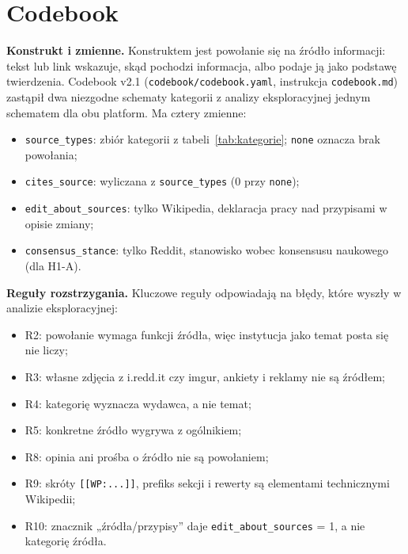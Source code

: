 \documentclass[11pt,a4paper]{article}
\newcommand{\kod}[1]{\texttt{#1}}
\newcommand{\tabela}[1]{{\small}}
\begin{document}
\section{Codebook}
\label{sec:codebook}

\textbf{Konstrukt i zmienne.} Konstruktem jest powołanie się na źródło informacji: tekst lub link wskazuje, skąd pochodzi informacja, albo podaje ją jako podstawę twierdzenia. Codebook v2.1 (\kod{codebook/codebook.yaml}, instrukcja \kod{codebook.md}) zastąpił dwa niezgodne schematy kategorii z analizy eksploracyjnej jednym schematem dla obu platform. Ma cztery zmienne:
\begin{itemize}
  \item \kod{source\_types}: zbiór kategorii z tabeli~\ref{tab:kategorie}; \kod{none} oznacza brak powołania;
  \item \kod{cites\_source}: wyliczana z \kod{source\_types} (0 przy \kod{none});
  \item \kod{edit\_about\_sources}: tylko Wikipedia, deklaracja pracy nad przypisami w opisie zmiany;
  \item \kod{consensus\_stance}: tylko Reddit, stanowisko wobec konsensusu naukowego (dla H1-A).
\end{itemize}

\begin{table}[htbp]
\centering
\caption{Kategorie zmiennej \kod{source\_types} (codebook v2.1).}
\label{tab:kategorie}
\tabela{categories}
\end{table}

\textbf{Reguły rozstrzygania.} Kluczowe reguły odpowiadają na błędy, które wyszły w analizie eksploracyjnej:
\begin{itemize}
  \item R2: powołanie wymaga funkcji źródła, więc instytucja jako temat posta się nie liczy;
  \item R3: własne zdjęcia z i.redd.it czy imgur, ankiety i reklamy nie są źródłem;
  \item R4: kategorię wyznacza wydawca, a nie temat;
  \item R5: konkretne źródło wygrywa z ogólnikiem;
  \item R8: opinia ani prośba o źródło nie są powołaniem;
  \item R9: skróty \kod{[[WP:...]]}, prefiks sekcji i rewerty są elementami technicznymi Wikipedii;
  \item R10: znacznik „źródła/przypisy” daje \kod{edit\_about\_sources} = 1, a nie kategorię źródła.
\end{itemize}
\end{document}
